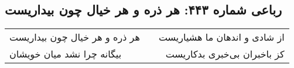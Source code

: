 \begin{center}
\section*{رباعی شماره ۴۴۳: هر ذره و هر خیال چون بیداریست}
\label{sec:0443}
\begin{longtable}{l p{0.5cm} r}
هر ذره و هر خیال چون بیداریست
&&
از شادی و اندهان ما هشیاریست
\\
بیگانه چرا نشد میان خویشان
&&
کز باخبران بی‌خبری بدکاریست
\\
\end{longtable}
\end{center}
